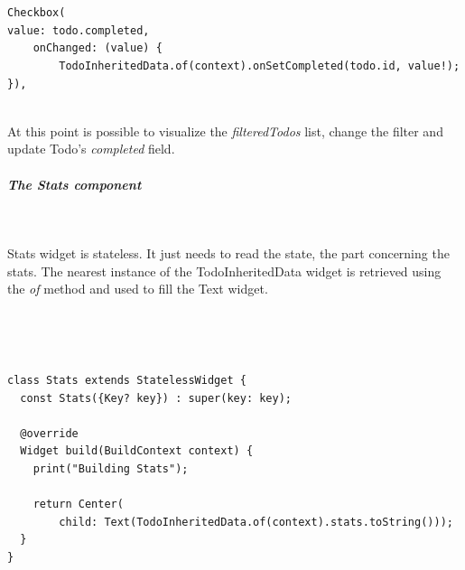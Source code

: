 \mbox{}\\

\begin{code}

\mbox{}\\
\label{code:2.28}
\begin{verbatim}
Checkbox(
value: todo.completed,
    onChanged: (value) {
    	TodoInheritedData.of(context).onSetCompleted(todo.id, value!);
}),
\end{verbatim}
\end{code}
\mbox{}\\


At this point is possible to visualize the \textit{filteredTodos} list, change the filter and update Todo’s \textit{completed }field.


\subparagraph{The Stats component}\mbox{}\\
\label{subpar:todo_app_inherited_widget_stats_component}

Stats widget is stateless. It just needs to read the state, the part concerning the stats. The nearest instance of the TodoInheritedData widget is retrieved using the \textit{of} method and used to fill the Text widget.


\mbox{}\\


\mbox{}\\
\begin{code}
\label{code:2.29}
\begin{verbatim}
class Stats extends StatelessWidget {
  const Stats({Key? key}) : super(key: key);

  @override
  Widget build(BuildContext context) {
    print("Building Stats");

    return Center(
        child: Text(TodoInheritedData.of(context).stats.toString()));
  }
}
\end{verbatim}
\end{code}

